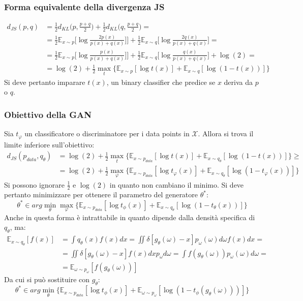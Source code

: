 		\subsubsection{Forma equivalente della divergenza JS}
		\begin{align*}
			d_{JS}(p,q) &= \frac{1}{2}d_{KL}\bigl(p, \frac{p+q}{2}\bigr) + \frac{1}{2}d_{KL}\bigl(q, \frac{p+q}{2}\bigr)=\\
			&=\frac{1}{2}\mathbb{E}_{x\sim p}\bigl[\log\frac{2p(x)}{p(x)+q(x)}]\bigr]+\frac{1}{2}\mathbb{E}_{x\sim q}\bigl[\log\frac{2q(x)}{p(x)+q(x)}\bigr]=\\
			&=\frac{1}{2}\mathbb{E}_{x\sim p}\bigl[\log\frac{p(x)}{p(x)+q(x)}]\bigr]+\frac{1}{2}\mathbb{E}_{x\sim q}\bigl[\log\frac{q(x)}{p(x)+q(x)}\bigr] + \log(2)=\\
			&=\log(2)+\frac{1}{2}\max\limits_t\{\mathbb{E}_{x\sim p}[\log t(x)]+\mathbb{E}_{x\sim q}[\log(1-t(x))]\}
		\end{align*}
		Si deve pertanto imparare $t(x)$, un binary classifier che predice se $x$ deriva da $p$ o $q$.
		
		\subsubsection{Obiettivo della GAN}
		Sia $t_\varphi$ un classificatore o discriminatore per i data points in $\mathcal{X}$.
		Allora si trova il limite inferiore sull'obiettivo:
		\begin{align*}
			d_{JS}(p_{data}, q_\theta) &= \log(2) + \frac{1}{2}\max\limits_t\{\mathbb{E}_{x\sim p_{data}}[\log t(x)] + \mathbb{E}_{x\sim q_\theta}[\log(1-t(x))]\}\ge\\
			&= \log(2) + \frac{1}{2}\max\limits_\varphi\{\mathbb{E}_{x\sim p_{data}}[\log t_\varphi(x)] + \mathbb{E}_{x\sim q_\theta}[\log(1-t_\varphi(x))]\}
		\end{align*}
		Si possono ignorare $\frac{1}{2}$ e $\log(2)$ in quanto non cambiano il minimo.
		Si deve pertanto minimizzare per ottenere il parametro del generatore $\theta^*$:
		$$\theta^*\in arg\min\limits_\theta\max\limits_\varphi\{\mathbb{E}_{x\sim p_{data}}[\log t_\phi(x)] + \mathbb{E}_{x\sim q_\theta}[\log(1-t_\theta(x))]\}$$
		Anche in questa forma \`e intrattabile in quanto dipende dalla densit\`a specifica di $q_\theta$, ma:
		\begin{align*}
			\mathbb{E}_{x\sim q_\theta}[f(x)] &= \int q_\theta(x)f(x)dx = \iint\delta[g_\theta(\omega)-x]p_\omega(\omega)d\omega f(x)dx=\\
			& = \iint\delta[g_\theta(\omega)-x]f(x)dxp_\omega d\omega = \int f(g_\theta(\omega))p_\omega(\omega)d\omega = \\
			&= \mathbb{E}_{\omega\sim p_\omega}[f(g_\theta(\omega))]
		\end{align*}
		Da cui si pu\`o sostituire con $g_\theta$:
		$$\theta^*\in arg\min\limits_{\theta}\{\mathbb{E}_{x\sim p_{data}}[\log t_\phi(x)]+\mathbb{E}_{\omega\sim p_\omega}[\log(1-t_\phi(g_\theta(\omega)))]\}$$
		
